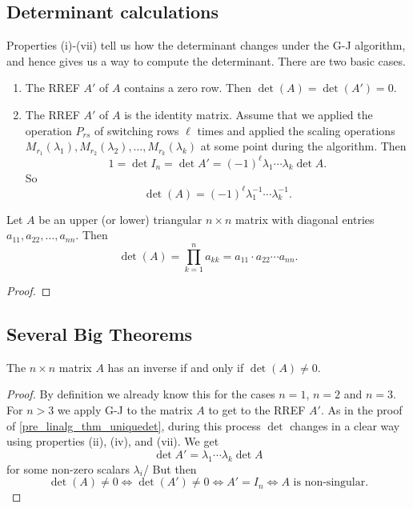 \documentclass[10pt, a4paper]{article}
\begin{document}
\subsection{Determinant calculations}
Properties (i)-(vii) tell us how the determinant changes under the G-J algorithm,
and hence gives us a way to compute the determinant.
There are two basic cases.
\begin{enumerate}[label = (\Roman*)]
    \item The RREF $A'$ of $A$ contains a zero row.
    Then $\det(A) = \det(A') = 0$.
    \item The RREF $A'$ of $A$ is the identity matrix.
    Assume that we applied the operation $P_{rs}$ of switching rows $\ell$ times and applied the scaling operations $M_{r_1}(\lambda_1), M_{r_2}(\lambda_2), \dotsc, M_{r_k}(\lambda_k)$ at some point during the algorithm.
    Then
    \[
    1 = \det I_n = \det A' = (-1) ^ \ell \lambda_1 \dotsi \lambda_k\det A.
    \]
    So
    \[
    \det(A) = (-1) ^ \ell \lambda_1 ^ {-1} \dotsi \lambda_k ^ {-1}.
    \]
\end{enumerate}
\begin{proposition}
    Let $A$ be an upper (or lower) triangular $n \times n$ matrix with diagonal entries $a_{11}, a_{22}, \dotsc, a_{nn}$.
    Then
    \[
    \det(A) = \prod_{k = 1}^{n}a_{kk} = a_{11} \cdot a_{22} \dotsi a_{nn}.
    \]
    \begin{proof}
        
    \end{proof}
\end{proposition}

\subsection{Several Big Theorems}
\begin{theorem}\label{pre_linalg_thm_invifdetnonzero}
    The $n \times n$ matrix $A$ has an inverse if and only if $\det(A) \neq 0$.
    \begin{proof}
        By definition we already know this for the cases $n = 1$,
        $n = 2$ and $n = 3$.
        For $n > 3$ we apply G-J to the matrix $A$ to get to the RREF $A'$.
        As in the proof of \autoref{pre_linalg_thm_uniquedet},
        during this process $\det$ changes in a clear way using properties (ii), (iv), and (vii).
        We get
        \[
        \det A' = \lambda_1\dotsi\lambda_k\det A
        \]
        for some non-zero scalars $\lambda_i$/
        But then
        \[
        \det(A) \neq 0 \iff \det(A') \neq 0 \iff A' = I_n \iff A \text{ is non-singular}.
        \]
    \end{proof}
\end{theorem}
\end{document}
